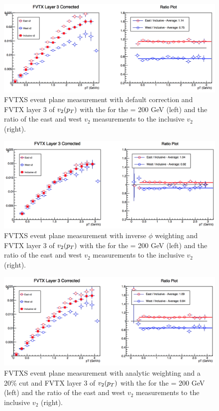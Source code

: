 \begin{figure}[!ht]
\centering
\includegraphics[width=0.65\linewidth]{figs/fvtx_3_default.png}
\caption{FVTXS event plane measurement with default correction and FVTX layer 3 of $v_{2}(\mbox{$p_T$})$ with the  for the \pau \sqsn = 200 GeV (left) and the ratio of the east and west $v_2$ measurements to the inclusive $v_2$ (right).}
\end{figure}

\begin{figure}[!ht]
\centering
\includegraphics[width=0.65\linewidth]{figs/fvtx_3_data.png}
\caption{FVTXS event plane measurement with inverse $\phi$ weighting and FVTX layer 3 of $v_{2}(\mbox{$p_T$})$ with the  for the \pau \sqsn = 200 GeV (left) and the ratio of the east and west $v_2$ measurements to the inclusive $v_2$ (right).}
\end{figure}

\begin{figure}[!ht]
\centering
\includegraphics[width=0.65\linewidth]{figs/fvtx_3_analytic.png}
\caption{FVTXS event plane measurement with analytic weighting and a 20\% cut and FVTX layer 3 of $v_{2}(\mbox{$p_T$})$ with the  for the \pau \sqsn = 200 GeV (left) and the ratio of the east and west $v_2$ measurements to the inclusive $v_2$ (right).}
\end{figure}

